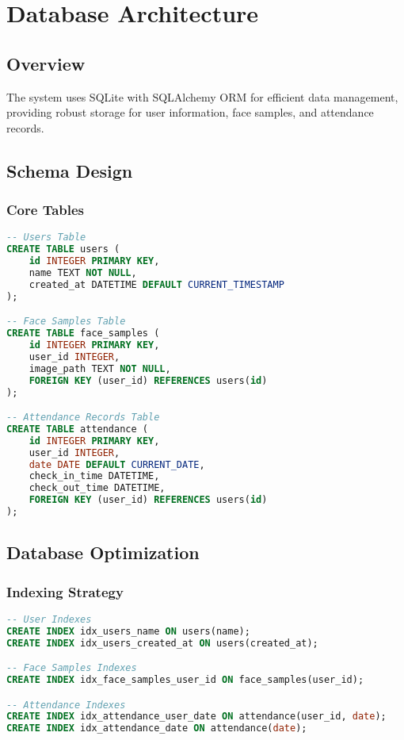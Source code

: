 \chapter{Database Architecture}

\section{Overview}
The system uses SQLite with SQLAlchemy ORM for efficient data management, providing robust storage for user information, face samples, and attendance records.

\section{Schema Design}

\subsection{Core Tables}
\begin{lstlisting}[language=SQL]
-- Users Table
CREATE TABLE users (
    id INTEGER PRIMARY KEY,
    name TEXT NOT NULL,
    created_at DATETIME DEFAULT CURRENT_TIMESTAMP
);

-- Face Samples Table
CREATE TABLE face_samples (
    id INTEGER PRIMARY KEY,
    user_id INTEGER,
    image_path TEXT NOT NULL,
    FOREIGN KEY (user_id) REFERENCES users(id)
);

-- Attendance Records Table
CREATE TABLE attendance (
    id INTEGER PRIMARY KEY,
    user_id INTEGER,
    date DATE DEFAULT CURRENT_DATE,
    check_in_time DATETIME,
    check_out_time DATETIME,
    FOREIGN KEY (user_id) REFERENCES users(id)
);
\end{lstlisting}

\section{Database Optimization}

\subsection{Indexing Strategy}
\begin{lstlisting}[language=SQL]
-- User Indexes
CREATE INDEX idx_users_name ON users(name);
CREATE INDEX idx_users_created_at ON users(created_at);

-- Face Samples Indexes
CREATE INDEX idx_face_samples_user_id ON face_samples(user_id);

-- Attendance Indexes
CREATE INDEX idx_attendance_user_date ON attendance(user_id, date);
CREATE INDEX idx_attendance_date ON attendance(date);
\end{lstlisting}

